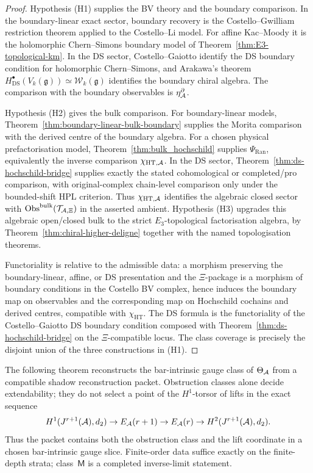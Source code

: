 \begin{proof}
Hypothesis \textup{(H1)} supplies the BV theory and the boundary
comparison. In the
boundary-linear exact sector, boundary recovery is the
Costello--Gwilliam restriction theorem applied to the Costello--Li
model. For affine Kac--Moody it is the holomorphic Chern--Simons
boundary model of Theorem~\ref{thm:E3-topological-km}. In the DS sector,
Costello--Gaiotto identify the DS boundary condition for holomorphic
Chern--Simons, and Arakawa's theorem
$H^\bullet_{\mathrm{DS}}(V_k(\mathfrak{g}))\simeq
\mathcal{W}_k(\mathfrak{g})$ identifies the boundary chiral algebra.
The comparison with the boundary observables is \(\eta^\partial_{\mathcal{A}}\).

Hypothesis \textup{(H2)} gives the bulk comparison. For
boundary-linear models, Theorem~\ref{thm:boundary-linear-bulk-boundary}
supplies the Morita comparison with the derived centre of the boundary
algebra. For a chosen physical prefactorisation model,
Theorem~\ref{thm:bulk_hochschild} supplies
\(\Psi_{\mathrm{Ran}}\), equivalently the inverse comparison
\(\chi_{\mathrm{HT},\mathcal{A}}\). In the DS sector,
Theorem~\ref{thm:ds-hochschild-bridge} supplies exactly the stated
cohomological or completed/pro comparison, with original-complex
chain-level comparison only under the bounded-shift HPL criterion.
Thus \(\chi_{\mathrm{HT},\mathcal{A}}\) identifies the algebraic closed sector
with \(\mathrm{Obs}^{\mathrm{bulk}}(\mathcal{T}_{\mathcal{A},\Xi})\) in the
asserted ambient.
Hypothesis \textup{(H3)} upgrades this algebraic open/closed bulk to
the strict $E_3$-topological factorisation algebra, by
Theorem~\ref{thm:chiral-higher-deligne} together with the named
topologisation theorems.

Functoriality is relative to the admissible data: a morphism preserving
the boundary-linear, affine, or DS presentation and the \(\Xi\)-package
is a morphism of boundary conditions in the Costello BV complex, hence
induces the boundary map on observables and the corresponding map on
Hochschild cochains and derived centres, compatible with
\(\chi_{\mathrm{HT}}\). The DS formula is the functoriality of the
Costello--Gaiotto DS boundary condition composed with
Theorem~\ref{thm:ds-hochschild-bridge} on the \(\Xi\)-compatible locus.
The class coverage is precisely the disjoint union of the three
constructions in \textup{(H1)}.
\end{proof}

\begin{remark}
The following theorem reconstructs the bar-intrinsic gauge class of
\(\Theta_{\mathcal{A}}\) from a compatible shadow reconstruction packet.
Obstruction classes alone decide extendability; they do not select a
point of the \(H^1\)-torsor of lifts in the exact sequence
\[
H^1(J^{r+1}(\mathcal{A}),d_2)\to E_{\mathcal{A}}(r+1)\to E_{\mathcal{A}}(r)\to
H^2(J^{r+1}(\mathcal{A}),d_2).
\]
Thus the packet contains both the obstruction class and the lift
coordinate in a chosen bar-intrinsic gauge slice. Finite-order data
suffice exactly on the finite-depth strata; class~$\mathsf M$ is a
completed inverse-limit statement.
\end{remark}

